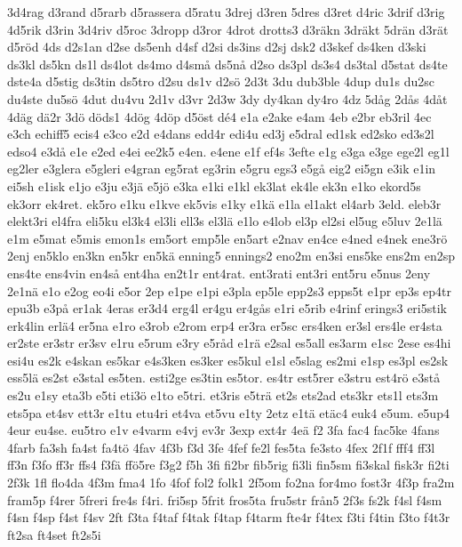 {{3d4rag
d3rand
d5rarb
d5rassera
d5ratu
3drej
d3ren
5dres
d3ret
d4ric
3drif
d3rig
4d5rik
d3rin
3d4riv
d5roc
3dropp
d3ror
4drot
drotts3
d3r^^e4kn
3dr^^e4kt
5dr^^e4n
d3r^^e4t
d5r^^f6d
4ds
d2s1an
d2se
ds5enh
d4sf
d2si
ds3ins
d2sj
dsk2
d3skef
ds4ken
d3ski
ds3kl
ds5kn
ds1l
ds4lot
ds4mo
d4sm^^e5
ds5n^^e5
d2so
ds3pl
ds3s4
ds3tal
d5stat
ds4te
dste4a
d5stig
ds3tin
ds5tro
d2su
ds1v
d2s^^f6
2d3t
3du
dub3ble
4dup
du1s
du2sc
du4ste
du5s^^f6
4dut
du4vu
2d1v
d3vr
2d3w
3dy
dy4kan
dy4ro
4dz
5d^^e5g
2d^^e5s
4d^^e5t
4d^^e4g
d^^e42r
3d^^f6
d^^f6ds1
4d^^f6g
4d^^f6p
d5^^f6st
d^^e94
e1a
e2ake
e4am
4eb
e2br
eb3ril
4ec
e3ch
echiff5
ecis4
e3co
e2d
e4dans
edd4r
edi4u
ed3j
e5dral
ed1sk
ed2sko
ed3s2l
edso4
e3d^^e5
e1e
e2ed
e4ei
ee2k5
e4en.
e4ene
e1f
ef4s
3efte
e1g
e3ga
e3ge
ege2l
eg1l
eg2ler
e3glera
e5gleri
e4gran
eg5rat
eg3rin
e5gru
egs3
e5g^^e5
eig2
ei5gn
e3ik
e1in
ei5sh
e1isk
e1jo
e3ju
e3j^^e4
e5j^^f6
e3ka
e1ki
e1kl
ek3lat
ek4le
ek3n
e1ko
ekord5s
ek3orr
ek4ret.
ek5ro
e1ku
e1kve
ek5vis
e1ky
e1k^^e4
e1la
el1akt
el4arb
3eld.
eleb3r
elekt3ri
el4fra
eli5ku
el3k4
el3li
ell3s
el3l^^e4
e1lo
e4lob
el3p
el2si
el5ug
e5luv
2e1l^^e4
e1m
e5mat
e5mis
emon1s
em5ort
emp5le
en5art
e2nav
en4ce
e4ned
e4nek
ene3r^^f6
2enj
en5klo
en3kn
en5kr
en5k^^e4
enning5
ennings2
eno2m
en3si
ens5ke
ens2m
en2sp
ens4te
ens4vin
en4s^^e5
ent4ha
en2t1r
ent4rat.
ent3rati
ent3ri
ent5ru
e5nus
2eny
2e1n^^e4
e1o
e2og
eo4i
e5or
2ep
e1pe
e1pi
e3pla
ep5le
epp2s3
epps5t
e1pr
ep3s
ep4tr
epu3b
e3p^^e5
er1ak
4eras
er3d4
erg4l
er4gu
er4g^^e5s
e1ri
e5rib
e4rinf
erings3
eri5stik
erk4lin
erl^^e44
er5na
e1ro
e3rob
e2rom
erp4
er3ra
er5sc
ers4ken
er3sl
ers4le
er4sta
er2ste
er3str
er3sv
e1ru
e5rum
e3ry
e5r^^e5d
e1r^^e4
e2sal
es5all
es3arm
e1sc
2ese
es4hi
esi4u
es2k
e4skan
es5kar
e4s3ken
es3ker
es5kul
e1sl
e5slag
es2mi
e1sp
es3pl
es2sk
ess5l^^e4
es2st
e3stal
es5ten.
esti2ge
es3tin
es5tor.
es4tr
est5rer
e3stru
est4r^^f6
e3st^^e5
es2u
e1sy
eta3b
e5ti
eti3^^f6
e1to
e5tri.
et3ris
e5tr^^e4
et2s
ets2ad
ets3kr
ets1l
ets3m
ets5pa
et4sv
ett3r
e1tu
etu4ri
et4va
et5vu
e1ty
2etz
e1t^^e4
et^^e4c4
euk4
e5um.
e5up4
4eur
eu4se.
eu5tro
e1v
e4varm
e4vj
ev3r
3exp
ext4r
4e^^e4
f2
3fa
fac4
fac5ke
4fans
4farb
fa3sh
fa4st
fa4t^^f6
4fav
4f3b
f3d
3fe
4fef
fe2l
fes5ta
fe3sto
4fex
2f1f
fff4
ff3l
ff3n
f3fo
ff3r
ffs4
f3f^^e4
ff^^f65re
f3g2
f5h
3fi
fi2br
fib5rig
fi3li
fin5sm
fi3skal
fisk3r
fi2ti
2f3k
1fl
flo4da
4f3m
fma4
1fo
4fof
fol2
folk1
2f5om
fo2na
for4mo
fost3r
4f3p
fra2m
fram5p
f4rer
5freri
fre4s
f4ri.
fri5sp
5frit
fros5ta
fru5str
fr^^e5n5
2f3s
fs2k
f4sl
f4sm
f4sn
f4sp
f4st
f4sv
2ft
f3ta
f4taf
f4tak
f4tap
f4tarm
fte4r
f4tex
f3ti
f4tin
f3to
f4t3r
ft2sa
ft4set
ft2s5i
}}
